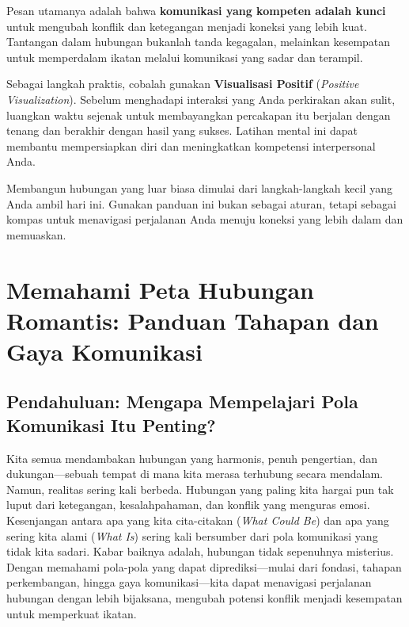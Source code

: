 \documentclass[
  letterpaper,
  DIV=11,
  numbers=noendperiod]{scrreprt}
\begin{document}
Pesan utamanya adalah bahwa \textbf{komunikasi yang kompeten adalah
kunci} untuk mengubah konflik dan ketegangan menjadi koneksi yang lebih
kuat. Tantangan dalam hubungan bukanlah tanda kegagalan, melainkan
kesempatan untuk memperdalam ikatan melalui komunikasi yang sadar dan
terampil.

Sebagai langkah praktis, cobalah gunakan \textbf{Visualisasi Positif}
(\emph{Positive Visualization}). Sebelum menghadapi interaksi yang Anda
perkirakan akan sulit, luangkan waktu sejenak untuk membayangkan
percakapan itu berjalan dengan tenang dan berakhir dengan hasil yang
sukses. Latihan mental ini dapat membantu mempersiapkan diri dan
meningkatkan kompetensi interpersonal Anda.

Membangun hubungan yang luar biasa dimulai dari langkah-langkah kecil
yang Anda ambil hari ini. Gunakan panduan ini bukan sebagai aturan,
tetapi sebagai kompas untuk menavigasi perjalanan Anda menuju koneksi
yang lebih dalam dan memuaskan.


\chapter{Memahami Peta Hubungan Romantis: Panduan Tahapan dan Gaya
Komunikasi}\label{memahami-peta-hubungan-romantis-panduan-tahapan-dan-gaya-komunikasi}

\section{Pendahuluan: Mengapa Mempelajari Pola Komunikasi Itu
Penting?}\label{pendahuluan-mengapa-mempelajari-pola-komunikasi-itu-penting}

Kita semua mendambakan hubungan yang harmonis, penuh pengertian, dan
dukungan---sebuah tempat di mana kita merasa terhubung secara mendalam.
Namun, realitas sering kali berbeda. Hubungan yang paling kita hargai
pun tak luput dari ketegangan, kesalahpahaman, dan konflik yang menguras
emosi. Kesenjangan antara apa yang kita cita-citakan (\emph{What Could
Be}) dan apa yang sering kita alami (\emph{What Is}) sering kali
bersumber dari pola komunikasi yang tidak kita sadari. Kabar baiknya
adalah, hubungan tidak sepenuhnya misterius. Dengan memahami pola-pola
yang dapat diprediksi---mulai dari fondasi, tahapan perkembangan, hingga
gaya komunikasi---kita dapat menavigasi perjalanan hubungan dengan lebih
bijaksana, mengubah potensi konflik menjadi kesempatan untuk memperkuat
ikatan.
\end{document}
